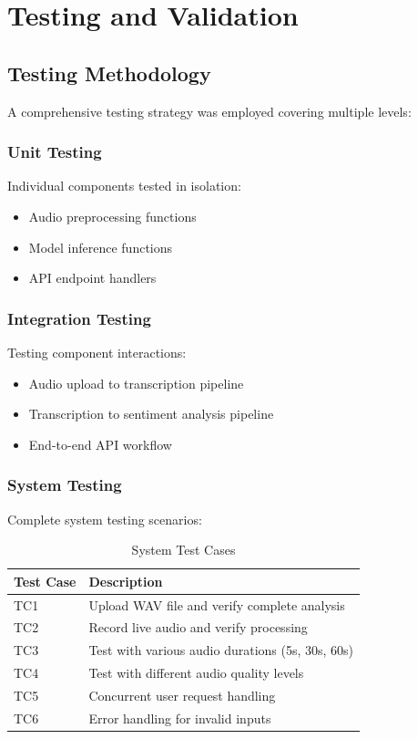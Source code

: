 \documentclass[12pt,a4paper]{report}
\begin{document}
\section{Testing and Validation}
\subsection{Testing Methodology}
A comprehensive testing strategy was employed covering multiple levels:

\subsubsection{Unit Testing}
Individual components tested in isolation:

\begin{itemize}
    \item Audio preprocessing functions
    \item Model inference functions
    \item API endpoint handlers
\end{itemize}

\subsubsection{Integration Testing}
Testing component interactions:

\begin{itemize}
    \item Audio upload to transcription pipeline
    \item Transcription to sentiment analysis pipeline
    \item End-to-end API workflow
\end{itemize}

\subsubsection{System Testing}
Complete system testing scenarios:

\begin{table}[H]
\centering
\caption{System Test Cases}
\label{tab:test_cases}
\begin{tabular}{@{}lp{8cm}@{}}
\toprule
\textbf{Test Case} & \textbf{Description} \\ \midrule
TC1 & Upload WAV file and verify complete analysis \\
TC2 & Record live audio and verify processing \\
TC3 & Test with various audio durations (5s, 30s, 60s) \\
TC4 & Test with different audio quality levels \\
TC5 & Concurrent user request handling \\
TC6 & Error handling for invalid inputs \\ \bottomrule
\end{tabular}
\end{table}
\end{document}
